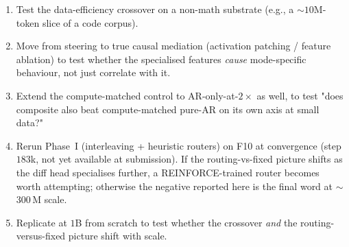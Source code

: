 \begin{enumerate}
  \item Test the data-efficiency crossover on a non-math substrate
        (e.g., a $\sim 10$M-token slice of a code corpus).
  \item Move from steering to true causal mediation (activation
        patching / feature ablation) to test whether the specialised
        features \emph{cause} mode-specific behaviour, not just
        correlate with it.
  \item Extend the compute-matched control to AR-only-at-$2\times$ as
        well, to test "does composite also beat compute-matched
        pure-AR on its own axis at small data?"
  \item Rerun Phase~I (interleaving + heuristic routers) on F10 at
        convergence (step $183$k, not yet available at submission).
        If the routing-vs-fixed picture shifts as the diff head
        specialises further, a REINFORCE-trained router becomes
        worth attempting; otherwise the negative reported here is the
        final word at $\sim$300\,M scale.
  \item Replicate at $1$B from scratch to test whether the crossover
        \emph{and} the routing-versus-fixed picture shift with scale.
\end{enumerate}
